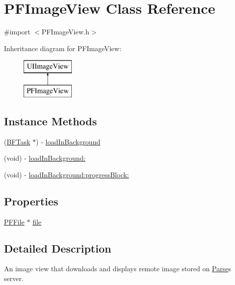 \hypertarget{interface_p_f_image_view}{}\section{P\+F\+Image\+View Class Reference}
\label{interface_p_f_image_view}


{\ttfamily \#import $<$P\+F\+Image\+View.\+h$>$}

Inheritance diagram for P\+F\+Image\+View\+:\begin{figure}[H]
\begin{center}
\leavevmode
\includegraphics[height=2.000000cm]{interface_p_f_image_view}
\end{center}
\end{figure}
\subsection*{Instance Methods}
\begin{DoxyCompactItemize}
\item 
(\hyperlink{interface_b_f_task}{B\+F\+Task} $\ast$) -\/ \hyperlink{interface_p_f_image_view_a264b6a75e2742b810c2c82e486c9c48a}{load\+In\+Background}
\item 
(void) -\/ \hyperlink{interface_p_f_image_view_ad8eda353465fd2060e42c89c030def95}{load\+In\+Background\+:}
\item 
(void) -\/ \hyperlink{interface_p_f_image_view_a7162d155cdf1cc6e23c98cdbfba52091}{load\+In\+Background\+:progress\+Block\+:}
\end{DoxyCompactItemize}
\subsection*{Properties}
\begin{DoxyCompactItemize}
\item 
\hyperlink{interface_p_f_file}{P\+F\+File} $\ast$ \hyperlink{interface_p_f_image_view_a347d88561d776131905b46021a0aa07e}{file}
\end{DoxyCompactItemize}


\subsection{Detailed Description}
An image view that downloads and displays remote image stored on \hyperlink{interface_parse}{Parse}\textquotesingle{}s server. 

